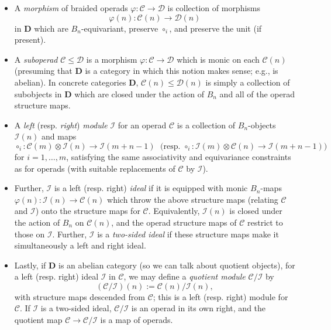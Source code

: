 \documentclass[12pt]{article}
\newcommand{\CC} {\mathcal{C}}
\newcommand{\DD} {\mathcal{D}}
\newcommand{\bD} {\mathbf{D}}
\newcommand{\II}{\mathcal{I}}
\theoremstyle{plain}
\theoremstyle{definition}
\theoremstyle{remark}
\begin{document}
\begin{itemize}

\item A \emph{morphism} of braided operads $\varphi: \CC \to \DD$ is collection of morphisms 
%
$$\varphi(n): \CC(n) \to \DD(n)$$
%
in $\bD$ which are $B_n$-equivariant, preserve $\circ_i$, and preserve the unit (if present). 

\item A \emph{suboperad} $\CC \leq \DD$ is a morphism $\varphi: \CC \to \DD$ which is monic on each $\CC(n)$ (presuming that $\bD$ is a category in which this notion makes sense; e.g., is abelian).  In concrete categories $\bD$, $\CC(n) \leq \DD(n)$ is simply a collection of subobjects in $\bD$ which are closed under the action of $B_n$ and all of the operad structure maps.  

\item A \emph{left} (resp. \emph{right}) \emph{module} $\II$ for an operad $\CC$ is a collection of $B_n$-objects $\II(n)$ and maps
%
$$\circ_i: \CC(m) \otimes \II(n) \to \II(m+n-1)\; \mbox{ (resp. } \circ_i: \II(m) \otimes \CC(n) \to \II(m+n-1))$$
%
for $i=1, \dots, m$, satisfying the same associativity and equivariance constraints as for operads (with suitable replacements of $\CC$ by $\II$).  

\item Further, $\II$ is a left (resp. right) \emph{ideal} if it is equipped with monic $B_n$-maps $\varphi(n): \II(n) \to \CC(n)$ which throw the above structure maps (relating $\CC$ and $\II$) onto the structure maps for $\CC$.  Equivalently, $\II(n)$ is closed under the action of $B_n$ on $\CC(n)$, and the operad structure maps of $\CC$ restrict to those on $\II$.  Further, $\II$ is a \emph{two-sided ideal} if these structure maps make it simultaneously a left and right ideal.

\item Lastly, if $\bD$ is an abelian category (so we can talk about quotient objects), for a left (resp. right) ideal $\II$ in $\CC$, we may define a \emph{quotient module} $\CC/\II$ by 
%
$$(\CC/\II)(n) := \CC(n) / \II(n),$$
%
with structure maps descended from $\CC$; this is a left (resp. right) module for $\CC$.  If $\II$ is a two-sided ideal, $\CC/\II$ is an operad in its own right, and the quotient map $\CC \to \CC/\II$ is a map of operads.

\end{itemize}
\end{document}
